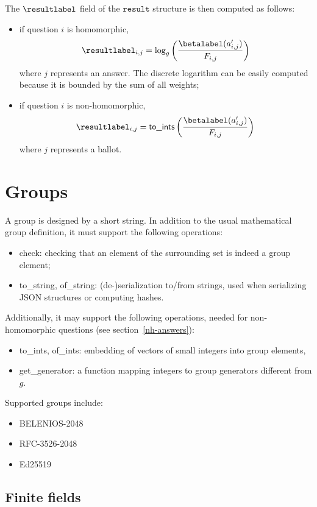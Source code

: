 \documentclass[a4paper]{article}
\newcommand{\result}{\texttt{result}}
\begin{document}
The $\resultlabel$ field of the $\result$ structure is then computed
as follows:
\begin{itemize}
\item if question $i$ is homomorphic,
  \[
    \resultlabel_{i,j}=\log_g\left(\frac{\betalabel(a'_{i,j})}{F_{i,j}}\right)
  \]
  where $j$ represents an answer. The discrete logarithm can be easily
  computed because it is bounded by the sum of all weights;
\item if question $i$ is non-homomorphic,
  \[
    \resultlabel_{i,j}=\textsf{to\_ints}\left(\frac{\betalabel(a'_{i,j})}{F_{i,j}}\right)
  \]
  where $j$ represents a ballot.
\end{itemize}

\section{Groups}
\label{default-group}

A group is designed by a short string. In addition to the usual
mathematical group definition, it must support the following
operations:
\begin{itemize}
\item \textsf{check}: checking that an element of the surrounding set
  is indeed a group element;
\item \textsf{to\_string}, \textsf{of\_string}: (de-)serialization
  to/from strings, used when serializing JSON structures or computing
  hashes.
\end{itemize}
Additionally, it may support the following operations, needed for
non-homomorphic questions (see section~\ref{nh-answers}):
\begin{itemize}
\item \textsf{to\_ints}, \textsf{of\_ints}: embedding of vectors of
  small integers into group elements,
\item \textsf{get\_generator}: a function mapping integers to group
  generators different from $g$.
\end{itemize}
Supported groups include:
\begin{itemize}
\item BELENIOS-2048
\item RFC-3526-2048
\item Ed25519
\end{itemize}

\subsection{Finite fields}
\end{document}
